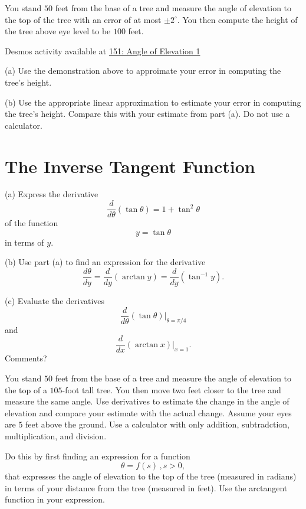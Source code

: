 \documentclass{ximera}
\begin{document}
\begin{question}  \label{Q:defr4gg4t}
You stand $50$ feet from the base of a tree and measure the angle of elevation to the top of the tree with an error of at most $\pm 2^\circ$. You then compute the height of the tree above eye level to be $100$ feet. 

\begin{onlineOnly}
    \begin{center}
\end{center}
\end{onlineOnly}

Desmos activity available at \href{https://www.desmos.com/calculator/yjyghsoeog}{151: Angle of Elevation 1}

(a) Use the demonstration above to approimate your error in computing the tree's height.  

(b) Use the appropriate linear approximation to estimate your error in computing the tree's height. Compare this with your estimate from part (a). Do not use a calculator.
\end{question}


\section*{The Inverse Tangent Function}
\begin{question}  \label{Q:KKDbret434}
(a) Express the derivative
\[
     \frac{d}{d\theta} \left( \tan\theta  \right) = 1 + \tan^2\theta
\]
of the function 
\[
    y = \tan\theta
\]
in terms of $y$.

(b) Use part (a) to find an expression for the derivative
\[
   \frac{d\theta}{dy} = \frac{d}{dy} \left(  \arctan y \right) =  \frac{d}{dy} \left(  \tan^{-1} y \right) .
\]

(c) Evaluate the derivatives
\[
   \frac{d}{d\theta} \left( \tan\theta  \right)\Big|_{\theta = \pi/4}
\]
and
\[
  \frac{d}{dx} \left(  \arctan x \right)\Big|_{x=1} . 
\]
Comments?
\end{question}

\begin{question}  \label{Q45544fhL}
You stand $50$ feet from the base of a tree and measure the angle of elevation to the top of a $105$-foot tall tree. You then move two feet closer to the tree and measure the same angle. Use derivatives to estimate the change in the angle of elevation and compare your estimate with the actual change. Assume your eyes are $5$ feet above the ground. Use a calculator with only addition, subtradction, multiplication, and division.

Do this by first finding an expression for a function
\[
    \theta = f(s) \, , s>0 ,
\]
that expresses the angle of elevation to the top of the tree (measured in radians) in terms of your distance from the tree (measured in feet). Use the arctangent function in your expression.

\end{question}
\end{document}
